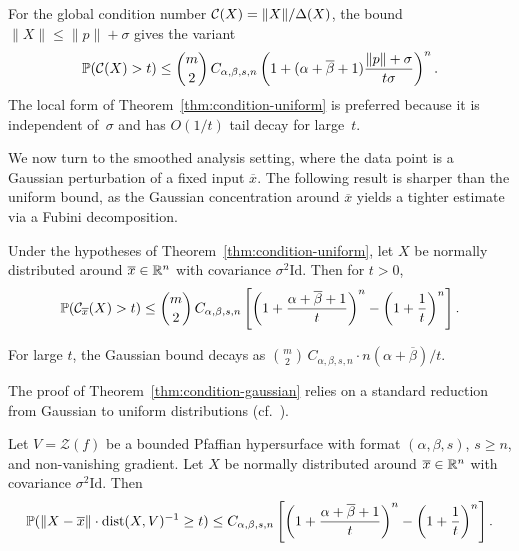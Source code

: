 \begin{remark}\label{rem:global-condition}
For the global condition number $\mathcal{C}(X) = \|X\|/\Delta(X)$, the bound $\|X\|\leq \|p\| + \sigma$ gives the variant
\begin{equation*}
  \mathbb{P}(\mathcal{C}(X) > t) \leq \binom{m}{2}\, C_{\alpha,\beta,s,n}\left(1 + (\alpha + \overline{\beta} + 1)\frac{\|p\| + \sigma}{t\sigma}\right)^n.
\end{equation*}
The local form of Theorem~\ref{thm:condition-uniform} is preferred because it is independent of~$\sigma$ and has $O(1/t)$ tail decay for large~$t$.
\end{remark}

We now turn to the smoothed analysis setting, where the data point is a Gaussian perturbation of a fixed input $\overline{x}$. The following result is sharper than the uniform bound, as the Gaussian concentration around $\overline{x}$ yields a tighter estimate via a Fubini decomposition.

\begin{theorem}\label{thm:condition-gaussian}
Under the hypotheses of Theorem~\ref{thm:condition-uniform}, let $X$ be normally distributed around $\overline{x}\in \mathbb{R}^n$ with covariance $\sigma^2 \mathrm{Id}$. Then for $t > 0$,
\begin{equation*}
\mathbb{P}(\mathcal{C}_{\overline{x}}(X) > t) \leq \binom{m}{2}\, C_{\alpha,\beta,s,n}\left[\left(1+\frac{\alpha+\overline{\beta}+1}{t}\right)^n - \left(1+\frac{1}{t}\right)^n\right].
\end{equation*}
\end{theorem}

\begin{remark}
For large $t$, the Gaussian bound decays as $\binom{m}{2}\, C_{\alpha,\beta,s,n}\cdot n(\alpha+\overline{\beta})/t$.
\end{remark}

The proof of Theorem~\ref{thm:condition-gaussian} relies on a standard reduction from Gaussian to uniform distributions (cf.~\cite[Section~3.1]{burgisser2013condition}).

\begin{lemma}\label{lem:gauss-to-uniform}
Let $V = \mathcal{Z}(f)$ be a bounded Pfaffian hypersurface with format $(\alpha, \beta, s)$, $s\geq n$, and non-vanishing gradient. Let $X$ be normally distributed around $\overline{x}\in \mathbb{R}^{n}$ with covariance $\sigma^2 \mathrm{Id}$. Then
\begin{equation*}
\mathbb{P}(\|X-\overline{x}\|\cdot \operatorname{dist}(X,V)^{-1}\geq t) \leq C_{\alpha,\beta,s,n}\left[\left(1+\frac{\alpha+\overline{\beta}+1}{t}\right)^n - \left(1+\frac{1}{t}\right)^n\right].
\end{equation*}
\end{lemma}

